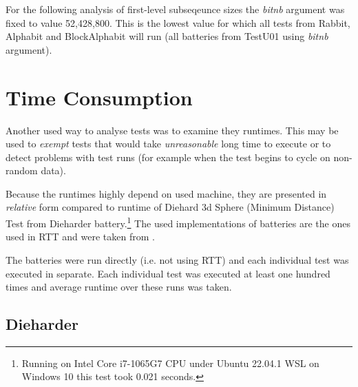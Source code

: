\documentclass[
  digital,     %
  oneside,     %
  nosansbold,  %
  nocolorbold, %
  nolof,         %
  nolot,         %
]{fithesis4}
\begin{document}
For the following analysis of first-level subseqeunce sizes the \emph{bit\textunderscore nb} argument was fixed to value 52,428,800. This is the lowest value for which all tests from Rabbit, Alphabit and BlockAlphabit will run (all batteries from TestU01 using \emph{bit\textunderscore nb} argument).




\section{Time Consumption} 

Another used way to analyse tests was to examine they runtimes. This may be used to \emph{exempt} tests that would take \emph{unreasonable} long time to execute or to detect problems with test runs (for example when the test begins to cycle on non-random data).

Because the runtimes highly depend on used machine, they are presented in \emph{relative} form compared to runtime of Diehard 3d Sphere (Minimum Distance) Test from Dieharder battery.\footnote{Running on Intel Core i7-1065G7 CPU under Ubuntu 22.04.1 WSL on Windows 10 this test took 0.021 seconds.} The used implementations of batteries are the ones used in RTT and were taken from \cite{rtt-batteries}.

The batteries were run directly (i.e. not using RTT) and each individual test was executed in separate. Each individual test was executed at least one hundred times and average runtime over these runs was taken.



\subsection{Dieharder}
\end{document}

